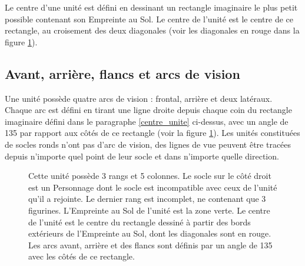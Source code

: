 Le centre d'une unité est défini en dessinant un rectangle imaginaire le plus petit possible contenant son Empreinte au Sol. Le centre de l'unité est le centre de ce rectangle, au croisement des deux diagonales (voir les diagonales en rouge dans la figure \ref{figure/arcs}).

\subsection{Avant, arrière, flancs et arcs de vision}

Une unité possède quatre arcs de vision : frontal, arrière et deux latéraux. Chaque arc est défini en tirant une ligne droite depuis chaque coin du rectangle imaginaire défini dans le paragraphe \ref{centre_unite} ci-dessus, avec un angle de 135{\text{\degree}} par rapport aux côtés de ce rectangle (voir la figure \ref{figure/arcs}). Les unités constituées de socles ronds n'ont pas d'arc de vision, des lignes de vue peuvent être tracées depuis n'importe quel point de leur socle et dans n'importe quelle direction.

\newcommand{\frontarc}{Arc frontal}
\newcommand{\leftsidearc}{Arc latéral}
\newcommand{\rightsidearc}{Arc latéral}
\newcommand{\reararc}{Arc arrière}
\newcommand{\centreofunit}{\normalfontsize Centre de l'unité}
\newcommand{\firstangle}{90 \text{\degree}}
\newcommand{\secondangle}{135 \text{\degree}}
\begin{figure}[!htbp]
\begin{minipage}[c]{0.65\textwidth}
\def\svgwidth{\textwidth}

\end{minipage}\hfill
\begin{minipage}[c]{0.32\textwidth}
\caption{Cette unité possède 3 rangs et 5 colonnes. Le socle sur le côté droit est un Personnage dont le socle est incompatible avec ceux de l'unité qu'il a rejointe. Le dernier rang est incomplet, ne contenant que 3 figurines. L'Empreinte au Sol de l'unité est la zone verte. Le centre de l'unité est le centre du rectangle dessiné à partir des bords extérieurs de l'Empreinte au Sol, dont les diagonales sont en rouge. Les arcs avant, arrière et des flancs sont définis par un angle de 135{\text{\degree}} avec les côtés de ce rectangle.}
\label{figure/arcs}
\end{minipage}
\end{figure}
